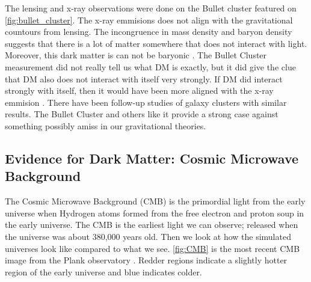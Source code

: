 The lensing and x-ray observations were done on the Bullet cluster featured on \cref{fig:bullet_cluster}.
The x-ray emmisions does not align with the gravitational countours from lensing.
The incongruence in mass density and baryon density suggests that there is a lot of matter somewhere that does not interact with light.
Moreover, this dark matter is can not be baryonic \cite{Clowe:BulletCluster}.
The Bullet Cluster measurement did not really tell us what DM is exactly, but it did give the clue that DM also does not interact with itself very strongly.
If DM did interact strongly with itself, then it would have been more aligned with the x-ray emmision \cite{Clowe:BulletCluster}.
There have been follow-up studies of galaxy clusters with similar results.
The Bullet Cluster and others like it provide a strong case against something possibly amiss in our gravitational theories.

\subsection{Evidence for Dark Matter: Cosmic Microwave Background\label{sec:ev4dm_cmb}}


\begin{figure}[ht]
\end{figure}

The Cosmic Microwave Background (CMB) is the primordial light from the early universe when Hydrogen atoms formed from the free electron and proton soup in the early universe.
The CMB is the earliest light we can observe; released when the universe was about 380,000 years old.
Then we look at how the simulated universes look like compared to what we see.
\cref{fig:CMB} is the most recent CMB image from the Plank observatory \cite{Plank:CMB}.
Redder regions indicate a slightly hotter region of the early universe and blue indicates colder.

